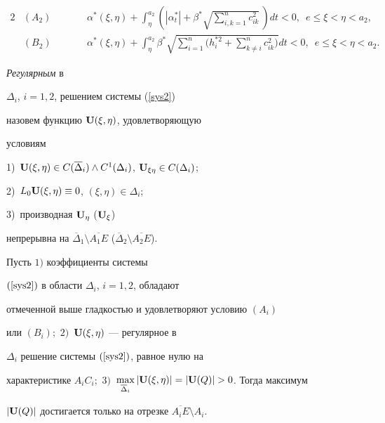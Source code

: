 \begin{alignat*}{2}


& (A_2) &\qquad &\alpha^* (\xi,\eta)+


\int_{\eta}^{a_2}\left(|\alpha^*_t|+ \beta^*


\sqrt{\sum_{i,k=1}^n c_{ik}^2}\,\right)dt<0,\ \;


e\le\xi <\eta < a_2,\\


%


& (B_2) &\qquad &\alpha^* (\xi,\eta)+


\int_{\eta}^{a_2}\beta^* \sqrt{\sum_{i=1}^n


\bigg(h_i^{*2}+\sum_{k\ne i}^n c_{ik}^2\bigg)}dt<0,\ \;


e\le\xi <\eta < a_2.


\end{alignat*}





\begin{defn}


{\it Регулярным} в


$\Delta_i$, $i=1,2$, решением системы (\ref{sys2})


назовем функцию ${\bold U}(\xi,\eta)$, удовлетворяющую


условиям


1)~${\bold U}(\xi,\eta)\in C(\overline \Delta_i)\land


C^1(\Delta_i)$, ${\bold U}_{\xi \eta }\in C(\Delta_i)$;


2)~$L_0{\bold U}(\xi,\eta)\equiv 0$, $(\xi,\eta)\in \Delta_i$;


3)~производная ${\bold U}_{\eta}$ (${\bold U}_{\xi}$)


непрерывна на $\overline{\Delta}_1


\setminus \overline{A_1E}$ ($\overline


{\Delta}_2\setminus \overline{A_2E}$).


\end{defn}





\begin{lem}


Пусть $1)$ коэффициенты системы


$(\ref{sys2})$ в области $\Delta_i$, $i=1,2$, обладают


отмеченной выше гладкостью и удовлетворяют условию $(A_i)$


или $(B_i);$ $2)$~${\bold U}(\xi,\eta)$ --- регулярное в


$\Delta_i$ решение системы $(\ref{sys2})$, равное нулю на


характеристике $A_iC_i;$ $3)$~$\max \limits_{\overline


\Delta_i} |{\bold U}(\xi,\eta)|=|{\bold U}(Q)|>0$. Тогда максимум


$|{\bold U}(Q)|$ достигается только на отрезке $\overline


{A_iE}\setminus A_i$.


\end{lem}





